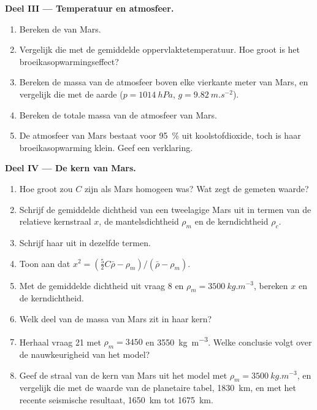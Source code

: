 \begin{problem}
\medskip
\noindent\textbf{Deel III --- Temperatuur en atmosfeer.}
\begin{enumerate}[resume]
  \item Bereken de  van Mars.
  \item Vergelijk die met de gemiddelde oppervlaktetemperatuur. Hoe groot is het broeikasopwarmingseffect?
  \item Bereken de massa van de atmosfeer boven elke vierkante meter van Mars, en vergelijk die met de aarde ($p = \qty{1014}{hPa}$,
        $g = \qty{9.82}{m.s^{-2}}$).
  \item Bereken de totale massa van de atmosfeer van Mars.
  \item De atmosfeer van Mars bestaat voor \qty{95}{\percent} uit koolstofdioxide, toch is haar broeikasopwarming klein. Geef een
        verklaring.
\end{enumerate}

\medskip
\noindent\textbf{Deel IV --- De kern van Mars.}
\begin{enumerate}[resume]
  \item Hoe groot zou $C$ zijn als Mars homogeen was? Wat zegt de gemeten waarde?
  \item Schrijf de gemiddelde dichtheid van een tweelagige Mars uit in termen van de relatieve kernstraal $x$, de mantelsdichtheid $\rho_m$ en de kerndichtheid $\rho_c$.
  \item Schrijf haar  uit in dezelfde termen.
  \item Toon aan dat $x^2 = (\tfrac52C\bar\rho - \rho_m)/(\bar\rho - \rho_m)$.
  \item Met de gemiddelde dichtheid uit vraag 8 en $\rho_m =
        \qty{3500}{kg.m^{-3}}$, bereken $x$ en de kerndichtheid.
  \item Welk deel van de massa van Mars zit in haar kern?
  \item Herhaal vraag 21 met $\rho_m = 3450$ en \qty{3550}{kg.m^{-3}}. Welke conclusie volgt over de nauwkeurigheid van het model?
  \item Geef de straal van de kern van Mars uit het model met $\rho_m = \qty{3500}{kg.m^{-3}}$, en vergelijk die met de waarde van de planetaire tabel, \qty{1830}{km}, en met het recente seismische resultaat, \qty{1650}{km} tot \qty{1675}{km}.
\end{enumerate}
\end{problem}
